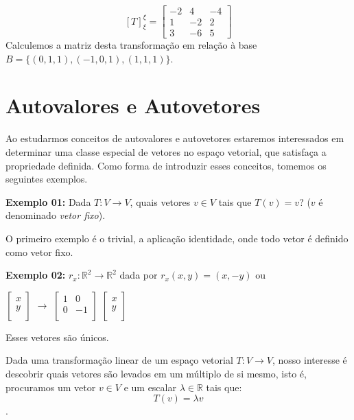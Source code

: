 \documentclass[oneside,a4paper,12pt]{article}
\begin{document}
$$[T]_{\xi}^{\xi} = \left[
\begin{array}{ccc}
-2	&	4	&	-4	\\
1	&	-2	&	2	\\
3	&	-6	&	5
\end{array}
\right] 
$$
Calculemos a matriz desta transformação em relação à base $B = \{ (0,1,1), (-1,0,1), (1,1,1) \}$.
\vspace{230pt}

\newpage
\section{Autovalores e Autovetores}

Ao estudarmos conceitos de autovalores e autovetores estaremos interessados em determinar uma classe especial de vetores no espaço vetorial, que satisfaça a propriedade definida. Como forma de introduzir esses conceitos, tomemos os seguintes exemplos.

{\bf Exemplo 01:} Dada $T: V \rightarrow V$, quais vetores $v \in V$ tais que $T(v) = v$? ($v$ é denominado \emph{vetor fixo}).

O primeiro exemplo é o trivial, a aplicação identidade, onde todo vetor é definido como vetor fixo.

{\bf Exemplo 02: } $r_x:\mathbb{R}^2 \rightarrow \mathbb{R}^2$ dada por $r_x (x,y) = (x,-y)$ ou 

$\left[
\begin{array}{c}
x\\
y \\
\end{array}
\right]$ $\rightarrow$
$\left[
\begin{array}{cc}
1	&	0\\
0	&	-1 \\
\end{array}
\right]$
$\left[
\begin{array}{c}
x\\
y \\
\end{array}
\right]$

\vspace{100pt}
Esses vetores são únicos.
\vspace{230pt}



Dada uma transformação linear de um espaço vetorial $T: V \rightarrow V$, nosso interesse é descobrir quais vetores são levados em um múltiplo de si mesmo, isto é, procuramos um vetor $v \in V$ e um escalar $\lambda \in \mathbb{R}$ tais que:
$$T(v) = \lambda v$$.
\end{document}
